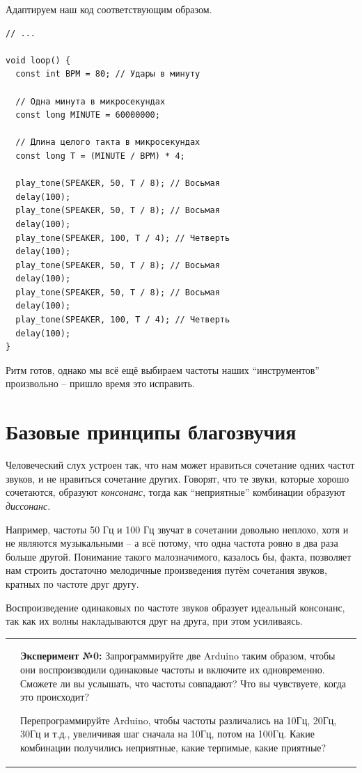 \documentclass[a4paper,twoside]{book}
\newcommand{\experiment}[2]{
  \vspace{8pt}
  \begin{tabularx}{\textwidth}{m{1cm} m{9cm}}
    
    & \textbf{Эксперимент №#1:} #2 \\
  \end{tabularx}
}
\begin{document}
Адаптируем наш код соответствующим образом.

\begin{verbatim}
// ...

void loop() {
  const int BPM = 80; // Удары в минуту

  // Одна минута в микросекундах
  const long MINUTE = 60000000;

  // Длина целого такта в микросекундах
  const long T = (MINUTE / BPM) * 4;

  play_tone(SPEAKER, 50, T / 8); // Восьмая
  delay(100);
  play_tone(SPEAKER, 50, T / 8); // Восьмая
  delay(100);
  play_tone(SPEAKER, 100, T / 4); // Четверть
  delay(100);
  play_tone(SPEAKER, 50, T / 8); // Восьмая
  delay(100);
  play_tone(SPEAKER, 50, T / 8); // Восьмая
  delay(100);
  play_tone(SPEAKER, 100, T / 4); // Четверть
  delay(100);
}
\end{verbatim}

Ритм готов, однако мы всё ещё выбираем частоты наших ``инструментов''
произвольно -- пришло время это исправить.

\newpage
\section{Базовые принципы благозвучия}

Человеческий слух устроен так, что нам может нравиться сочетание одних частот
звуков, и не нравиться сочетание других. Говорят, что те звуки, которые хорошо
сочетаются, образуют \emph{консонанс}, тогда как ``неприятные'' комбинации
образуют \emph{диссонанс}.

Например, частоты 50 Гц и 100 Гц звучат в сочетании довольно неплохо, хотя и не
являются музыкальными -- а всё потому, что одна частота ровно в два раза больше
другой. Понимание такого малозначимого, казалось бы, факта, позволяет нам
строить достаточно мелодичные произведения путём сочетания звуков, кратных по
частоте друг другу.

Воспроизведение одинаковых по частоте звуков образует идеальный консонанс, так
как их волны накладываются друг на друга, при этом усиливаясь.

\experiment{0}{ Запрограммируйте две Arduino таким образом, чтобы они
  воспроизводили одинаковые частоты и включите их одновременно. Сможете ли вы
  услышать, что частоты совпадают?  Что вы чувствуете, когда это происходит?

  Перепрограммируйте Arduino, чтобы частоты различались на 10Гц, 20Гц, 30Гц и
  т.д., увеличивая шаг сначала на 10Гц, потом на 100Гц. Какие комбинации
  получились неприятные, какие терпимые, какие приятные?}
\end{document}

